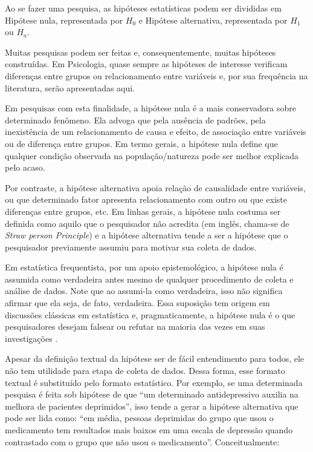 \documentclass[
]{book}
\begin{document}
Ao se fazer uma pesquisa, as hipóteses estatísticas podem ser divididas em Hipótese nula, representada por \(H_0\) e Hipótese alternativa, representada por \(H_1\) ou \(H_a\).

Muitas pesquisas podem ser feitas e, consequentemente, muitas hipóteses construídas. Em Psicologia, quase sempre as hipóteses de interesse verificam diferenças entre grupos ou relacionamento entre variáveis e, por sua frequência na literatura, serão apresentadas aqui.

Em pesquisas com esta finalidade, a hipótese nula é a mais conservadora sobre determinado fenômeno. Ela advoga que pela ausência de padrões, pela inexistência de um relacionamento de causa e efeito, de associação entre variáveis ou de diferença entre grupos. Em termo gerais, a hipótese nula define que qualquer condição observada na população/natureza pode ser melhor explicada pelo acaso.

Por contraste, a hipótese alternativa apoia relação de causalidade entre variáveis, ou que determinado fator apresenta relacionamento com outro ou que existe diferenças entre grupos, etc. Em linhas gerais, a hipótese nula costuma ser definida como aquilo que o pesquisador não acredita (em inglês, chama-se de \emph{Straw person Principle}) e a hipótese alternativa tende a ser a hipótese que o pesquisador previamente assumiu para motivar sua coleta de dados.

Em estatística frequentista, por um apoio epistemológico, a hipótese nula é assumida como verdadeira antes mesmo de qualquer procedimento de coleta e análise de dados. Note que ao assumi-la como verdadeira, isso não significa afirmar que ela seja, de fato, verdadeira. Essa suposição tem origem em discussões clássicas em estatística e, pragmaticamente, a hipótese nula é o que pesquisadores desejam falsear ou refutar na maioria das vezes em suas investigações \citep{Lecoutre2014}.

Apesar da definição textual da hipótese ser de fácil entendimento para todos, ele não tem utilidade para etapa de coleta de dados. Dessa forma, esse formato textual é substituído pelo formato estatístico. Por exemplo, se uma determinada pesquisa é feita sob hipótese de que ``um determinado antidepressivo auxilia na melhora de pacientes deprimidos'', isso tende a gerar a hipótese alternativa que pode ser lida como: ``em média, pessoas deprimidas do grupo que usou o medicamento tem resultados mais baixos em uma escala de depressão quando contrastado com o grupo que não usou o medicamento''. Conceitualmente:
\end{document}
